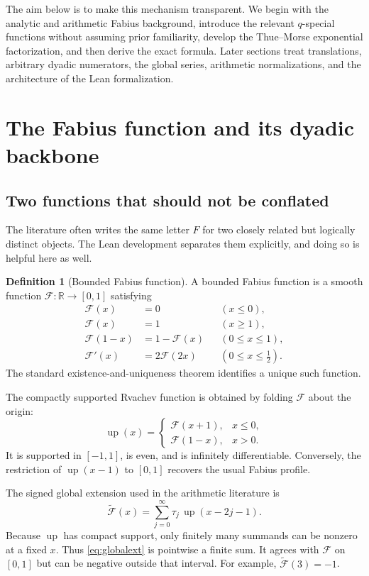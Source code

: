 \documentclass[11pt,oneside]{article}
\theoremstyle{definition}
\newtheorem{definition}[theorem]{Definition}
\theoremstyle{remark}
\newcommand{\F}{\mathcal F}
\newcommand{\G}{\widetilde{\mathcal F}}
\newcommand{\upfun}{\operatorname{up}}
\newcommand{\R}{\mathbb R}
\newcommand{\tm}{\tau}
\begin{document}
The aim below is to make this mechanism transparent.  We begin with the analytic and arithmetic Fabius background, introduce the relevant $q$-special functions without assuming prior familiarity, develop the Thue--Morse exponential factorization, and then derive the exact formula.  Later sections treat translations, arbitrary dyadic numerators, the global series, arithmetic normalizations, and the architecture of the Lean formalization.

\section{The Fabius function and its dyadic backbone}

\subsection{Two functions that should not be conflated}

The literature often writes the same letter $F$ for two closely related but logically distinct objects.  The Lean development separates them explicitly, and doing so is helpful here as well.

\begin{definition}[Bounded Fabius function]
A bounded Fabius function is a smooth function $\F:\R\to[0,1]$ satisfying
\begin{align}
  \F(x)&=0 &&(x\le 0),\label{eq:Fleft}\\
  \F(x)&=1 &&(x\ge 1),\label{eq:Fright}\\
  \F(1-x)&=1-\F(x) &&(0\le x\le1),\label{eq:Fsym}\\
  \F'(x)&=2\F(2x) &&(0\le x\le\tfrac12).\label{eq:Fder}
\end{align}
The standard existence-and-uniqueness theorem identifies a unique such function.
\end{definition}

The compactly supported Rvachev function is obtained by folding $\F$ about the origin:
\begin{equation}\label{eq:updef}
\upfun(x)=
\begin{cases}
 \F(x+1),&x\le0,\\
 \F(1-x),&x>0.
\end{cases}
\end{equation}
It is supported in $[-1,1]$, is even, and is infinitely differentiable.  Conversely, the restriction of $\upfun(x-1)$ to $[0,1]$ recovers the usual Fabius profile.

The signed global extension used in the arithmetic literature is
\begin{equation}\label{eq:globalext}
  \G(x)=\sum_{j=0}^{\infty}\tm_j\,
  \upfun(x-2j-1).
\end{equation}
Because $\upfun$ has compact support, only finitely many summands can be nonzero at a fixed $x$.  Thus \eqref{eq:globalext} is pointwise a finite sum.  It agrees with $\F$ on $[0,1]$ but can be negative outside that interval.  For example, $\G(3)=-1$.
\end{document}
